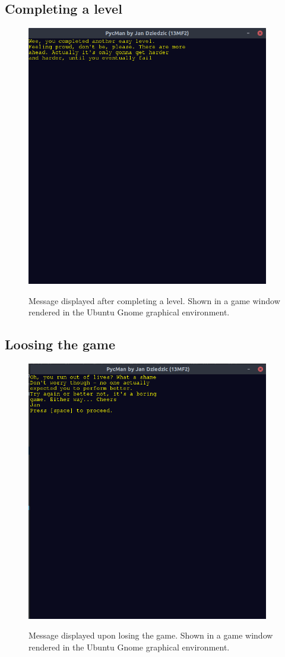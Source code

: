 \documentclass[11pt,a4paper,notitlepage]{report}
\newcommand{\dsubsection}[1]{\FloatBarrier \subsection{#1}}
\newenvironment{img}{
	\begin{center}
		\begin{figure}[H]
			\begin{center}
			
}{
	\end{center}
		\end{figure}
			\end{center}
}
\begin{document}
			\dsubsection{Completing a level}
				\begin{img}
						\includegraphics[width=300pt]{images/level-complete.png}\\
						\caption{Message displayed after completing a level. Shown in a game window rendered in the Ubuntu Gnome graphical environment.}
				\end{img}
			\dsubsection{Loosing the game}
				\begin{img}
					\includegraphics[width=300pt]{images/game_over_msg.png}\\
					\caption{Message displayed upon losing the game. Shown in a game window rendered in the Ubuntu Gnome graphical environment.}
				\end{img}
\end{document}
